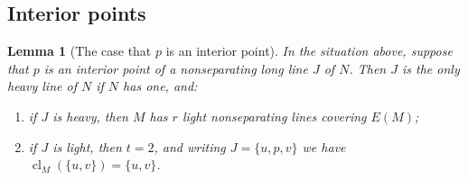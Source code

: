 \documentclass[11pt]{amsart}
\newtheorem{lemma}[theorem]{Lemma}
\theoremstyle{definition}
\theoremstyle{remark}
\numberwithin{equation}{section}
\newcommand{\cl}{\operatorname{cl}}
\begin{document}
\subsection{Interior points}

\begin{lemma}[The case that $p$ is an interior point]\label{lem:interior}
In the situation above, suppose that $p$ is an interior point of a nonseparating long line $J$ of $N$. Then $J$ is the only heavy line of $N$ if $N$ has one, and:
\begin{enumerate}[label=\textup{(\alph*)}]
\item if $J$ is heavy, then $M$ has $r$ light nonseparating lines covering $E(M)$;
\item if $J$ is light, then $t=2$, and writing $J=\{u,p,v\}$ we have $\cl_M(\{u,v\})=\{u,v\}$.
\end{enumerate}
\end{lemma}
\end{document}

